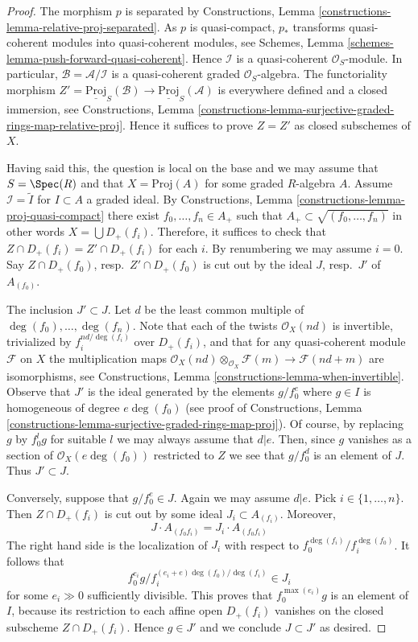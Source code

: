 \begin{proof}
The morphism $p$ is separated by
Constructions, Lemma \ref{constructions-lemma-relative-proj-separated}.
As $p$ is quasi-compact, $p_*$ transforms quasi-coherent modules
into quasi-coherent modules, see
Schemes, Lemma \ref{schemes-lemma-push-forward-quasi-coherent}.
Hence $\mathcal{I}$ is a quasi-coherent $\mathcal{O}_S$-module.
In particular, $\mathcal{B} = \mathcal{A}/\mathcal{I}$ is a
quasi-coherent graded $\mathcal{O}_S$-algebra. The functoriality
morphism $Z' = \underline{\text{Proj}}_S(\mathcal{B}) \to
\underline{\text{Proj}}_S(\mathcal{A})$ is everywhere defined and
a closed immersion, see Constructions, Lemma
\ref{constructions-lemma-surjective-graded-rings-map-relative-proj}.
Hence it suffices to prove $Z = Z'$ as closed subschemes of $X$.

\medskip\noindent
Having said this, the question is local on the base and we may assume
that $S = \Spec(R)$ and that $X = \text{Proj}(A)$ for some
graded $R$-algebra $A$. Assume $\mathcal{I} = \widetilde{I}$
for $I \subset A$ a graded ideal. By
Constructions, Lemma \ref{constructions-lemma-proj-quasi-compact}
there exist $f_0, \ldots, f_n \in A_{+}$ such that
$A_{+} \subset \sqrt{(f_0, \ldots, f_n)}$ in other words
$X = \bigcup D_{+}(f_i)$. Therefore, it suffices to check that
$Z \cap D_{+}(f_i) = Z' \cap D_{+}(f_i)$ for each $i$.
By renumbering we may assume $i = 0$.
Say $Z \cap D_{+}(f_0)$, resp.\ $Z' \cap D_{+}(f_0)$
is cut out by the ideal $J$, resp.\ $J'$ of $A_{(f_0)}$.

\medskip\noindent
The inclusion $J' \subset J$.
Let $d$ be the least common multiple of $\deg(f_0), \ldots, \deg(f_n)$.
Note that each of the twists $\mathcal{O}_X(nd)$ is invertible, trivialized
by $f_i^{nd/\deg(f_i)}$ over $D_{+}(f_i)$, and that for any quasi-coherent
module $\mathcal{F}$ on $X$ the multiplication maps
$\mathcal{O}_X(nd) \otimes_{\mathcal{O}_X} \mathcal{F}(m)
\to \mathcal{F}(nd + m)$ are isomorphisms, see
Constructions, Lemma \ref{constructions-lemma-when-invertible}.
Observe that $J'$ is the ideal generated by the elements $g/f_0^e$ where
$g \in I$ is homogeneous of degree $e\deg(f_0)$ (see proof of
Constructions, Lemma
\ref{constructions-lemma-surjective-graded-rings-map-proj}).
Of course, by replacing $g$ by $f_0^lg$ for suitable $l$
we may always assume that $d | e$. Then, since $g$ vanishes as a section of
$\mathcal{O}_X(e\deg(f_0))$ restricted to $Z$ we see that
$g/f_0^d$ is an element of $J$. Thus $J' \subset J$.

\medskip\noindent
Conversely, suppose that $g/f_0^e \in J$. Again we may assume $d | e$.
Pick $i \in \{1, \ldots, n\}$. Then $Z \cap D_{+}(f_i)$ is
cut out by some ideal $J_i \subset A_{(f_i)}$. Moreover,
$$
J \cdot A_{(f_0f_i)} = J_i \cdot A_{(f_0f_i)}
$$
The right hand side is the localization of $J_i$ with respect to
$f_0^{\deg(f_i)}/f_i^{\deg(f_0)}$. It follows that
$$
f_0^{e_i}g/f_i^{(e_i + e)\deg(f_0)/\deg(f_i)} \in J_i
$$
for some $e_i \gg 0$ sufficiently divisible. This proves that
$f_0^{\max(e_i)}g$ is an element of $I$, because its restriction to each
affine open $D_{+}(f_i)$ vanishes on the closed subscheme
$Z \cap D_{+}(f_i)$. Hence $g \in J'$ and we conclude $J \subset J'$
as desired.
\end{proof}

